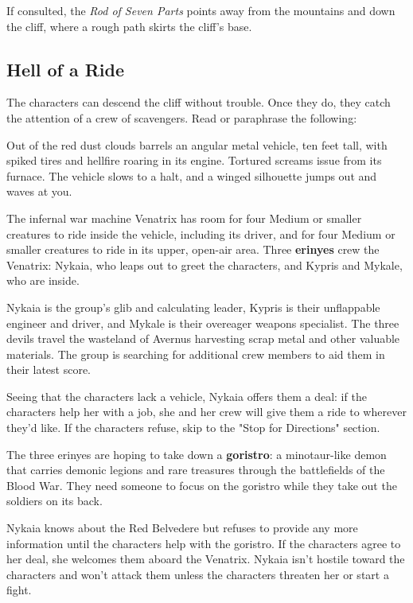 \documentclass[10pt,a4paper,twoside,bg=print,twocolumn,openany,nodeprecatedcode]{dndbook}
\begin{document}
If consulted, the \textit{Rod of Seven Parts} points away from the mountains and down the cliff, where a rough path skirts the cliff's base.

\subsection{Hell of a Ride}
The characters can descend the cliff without trouble. Once they do, they catch the attention of a crew of scavengers. Read or paraphrase the following:

\begin{DndReadAloud}{}
Out of the red dust clouds barrels an angular metal vehicle, ten feet tall, with spiked tires and hellfire roaring in its engine. Tortured screams issue from its furnace. The vehicle slows to a halt, and a winged silhouette jumps out and waves at you.

\end{DndReadAloud}

The infernal war machine Venatrix has room for four Medium or smaller creatures to ride inside the vehicle, including its driver, and for four Medium or smaller creatures to ride in its upper, open-air area. Three \textbf{erinyes} crew the Venatrix: Nykaia, who leaps out to greet the characters, and Kypris and Mykale, who are inside.

Nykaia is the group's glib and calculating leader, Kypris is their unflappable engineer and driver, and Mykale is their overeager weapons specialist. The three devils travel the wasteland of Avernus harvesting scrap metal and other valuable materials. The group is searching for additional crew members to aid them in their latest score.

Seeing that the characters lack a vehicle, Nykaia offers them a deal: if the characters help her with a job, she and her crew will give them a ride to wherever they'd like. If the characters refuse, skip to the "Stop for Directions" section.

The three erinyes are hoping to take down a \textbf{goristro}: a minotaur-like demon that carries demonic legions and rare treasures through the battlefields of the Blood War. They need someone to focus on the goristro while they take out the soldiers on its back.

Nykaia knows about the Red Belvedere but refuses to provide any more information until the characters help with the goristro. If the characters agree to her deal, she welcomes them aboard the Venatrix. Nykaia isn't hostile toward the characters and won't attack them unless the characters threaten her or start a fight.
\end{document}

